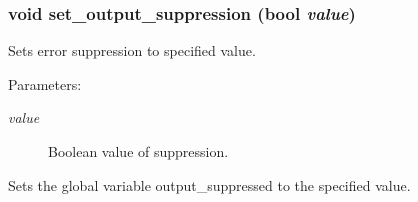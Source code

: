 \subsubsection{\setlength{\rightskip}{0pt plus 5cm}void set\_\-output\_\-suppression ({\bf bool} {\em value})}\label{util_8h_a0}


Sets error suppression to specified value. 

\begin{Desc}
\item[Parameters:]
\begin{description}
\item[{\em value}]Boolean value of suppression.\end{description}
\end{Desc}
Sets the global variable output\_\-suppressed to the specified value. 